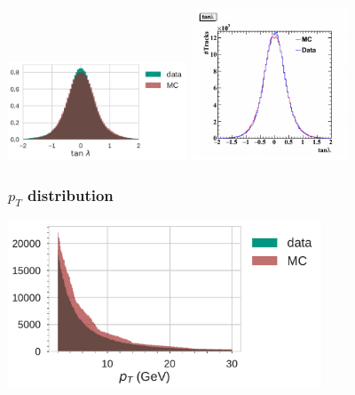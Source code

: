 \documentclass[18pt]{beamer}
\begin{document}
\begin{frame}[allowframebreaks]
  \includegraphics[width=0.4\textwidth]{figures/gcr_august_2017_tan_lambda_distribution.pdf}
  \includegraphics[width=0.35\textwidth]{figures/b2gm_tanlambda.png}\\
\end{frame}

\begin{frame}
  \frametitle{$p_T$ distribution}
  \includegraphics[width=0.7\textwidth]{figures/gcr_august_2017_pt_distribution.pdf}
\end{frame}
      
\end{document}
